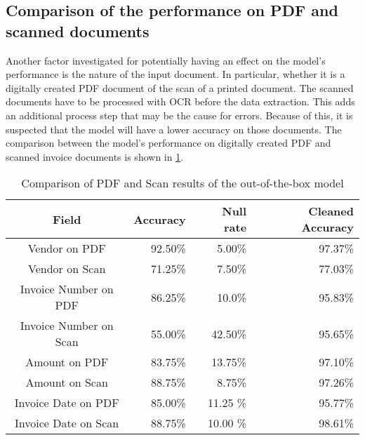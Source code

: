 \subsection*{Comparison of the performance on PDF and scanned documents}
Another factor investigated for potentially having an effect on the model's performance is the nature of the input document. In particular, whether it is a digitally created PDF document of the scan of a printed document. The scanned documents have to be processed with \ac{OCR} before the data extraction. This adds an additional process step that may be the cause for errors. Because of this, it is suspected that the model will have a lower accuracy on those documents. The comparison between the model's performance on digitally created PDF and scanned invoice documents is shown in \cref{table:Field_Com_Scan_PDF}.

\begin{table}[ht]   %
    \centering
    \footnotesize
    \begin{tabular}{c|rrr} %
        \toprule    %
        Field  & Accuracy  & Null rate & Cleaned Accuracy \\
        \midrule    %
        Vendor on PDF    & 92.50\%   &  5.00\%   & 97.37\% \\
        Vendor on Scan   & 71.25\%   &  7.50\%   & 77.03\% \\
        \midrule    %
        Invoice Number on PDF & 86.25\%   & 10.0\%  & 95.83\%\\
        Invoice Number on Scan & 55.00\%  & 42.50\%  & 95.65\%\\
        \midrule    %
        Amount on PDF      & 83.75\%   & 13.75\%  & 97.10\% \\
        Amount on Scan     & 88.75\%   & 8.75\%  & 97.26\% \\
        \midrule    %
        Invoice Date on PDF  & 85.00\%   & 11.25 \%  & 95.77\% \\
        Invoice Date on Scan & 88.75\%   & 10.00 \%  & 98.61\% \\
        
        \bottomrule %
    \end{tabular}
    \caption{Comparison of PDF and Scan results of the out-of-the-box model}
    \label{table:Field_Com_Scan_PDF}
\end{table}

